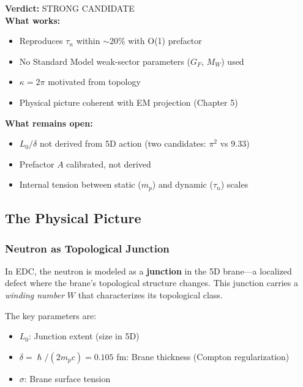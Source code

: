 \documentclass[11pt,a4paper]{article}
\newcommand{\hbar}{\hslash}
\begin{document}
\begin{tcolorbox}[colback=blue!5!white, colframe=blue!50!black, title=Status Summary]
\textbf{Verdict:} STRONG CANDIDATE \\[0.5em]
\textbf{What works:}
\begin{itemize}[nosep]
\item Reproduces $\tau_n$ within $\sim$20\% with O(1) prefactor
\item No Standard Model weak-sector parameters ($G_F$, $M_W$) used
\item $\kappa = 2\pi$ motivated from topology
\item Physical picture coherent with EM projection (Chapter 5)
\end{itemize}
\textbf{What remains open:}
\begin{itemize}[nosep]
\item $L_0/\delta$ not derived from 5D action (two candidates: $\pi^2$ vs 9.33)
\item Prefactor $A$ calibrated, not derived
\item Internal tension between static ($m_p$) and dynamic ($\tau_n$) scales
\end{itemize}
\end{tcolorbox}

\subsection{The Physical Picture}

\subsubsection{Neutron as Topological Junction}

In EDC, the neutron is modeled as a \textbf{junction} in the 5D brane---a localized defect where the brane's topological structure changes. This junction carries a \emph{winding number} $W$ that characterizes its topological class.

The key parameters are:
\begin{itemize}
\item $L_0$: Junction extent (size in 5D)
\item $\delta = \hbar/(2m_p c) = 0.105$ fm: Brane thickness (Compton regularization)
\item $\sigma$: Brane surface tension
\end{itemize}
\end{document}
